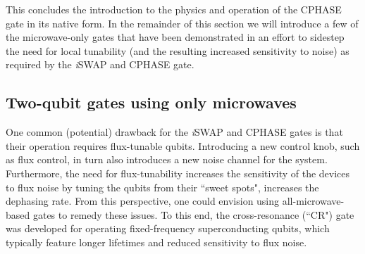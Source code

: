 \documentclass[aip,apr,twocolumn,showpacs,superscriptaddress,groupedaddress,nofootinbib,reprint]{revtex4-1}  %
\newcommand{\iSWAP}{\emph{i}\textsf{SWAP}}
\newcommand{\CPHASE}{\textsf{CPHASE}}
\newcommand{\CR}{\textsf{CR}}
\begin{document}
This concludes the introduction to the physics and operation of the \CPHASE{} gate in its native form. In the remainder of this section we will introduce a few of the microwave-only gates that have been demonstrated in an effort to sidestep the need for local tunability (and the resulting increased sensitivity to noise) as required by the \iSWAP{} and \CPHASE{} gate.



\subsection{\label{sec:CRgates}Two-qubit gates using only microwaves}
One common (potential) drawback for the \iSWAP{} and \CPHASE{} gates is that their operation requires flux-tunable qubits. Introducing a new control knob, such as flux control, in turn also introduces a new noise channel for the system. Furthermore, the need for flux-tunability increases the sensitivity of the devices to flux noise by tuning the qubits from their ``sweet spots", increases the dephasing rate. From this perspective, one could envision using all-microwave-based gates to remedy these issues. To this end, the cross-resonance (``\CR{}") gate was developed for operating fixed-frequency superconducting qubits\cite{Paraoanu2006,Rigetti2010,DeGroot2010}, which typically feature longer lifetimes and reduced sensitivity to flux noise.
\end{document}
